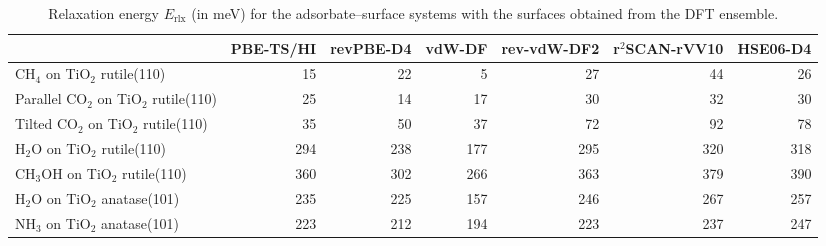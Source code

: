\begin{table}
\caption{\label{tab:lattice_parameters_tio2}Relaxation energy $E_\textrm{rlx}$ (in meV) for the adsorbate--surface systems with the  surfaces obtained from the DFT ensemble.}
\begin{tabular}{lrrrrrr}
\toprule
 & PBE-TS/HI & revPBE-D4 & vdW-DF & rev-vdW-DF2 & r$^2$SCAN-rVV10 & HSE06-D4 \\ 
\midrule
CH$_4$ on TiO$_2$ rutile(110) & 15 & 22 & 5 & 27 & 44 & 26 \\
Parallel CO$_2$ on TiO$_2$ rutile(110) & 25 & 14 & 17 & 30 & 32 & 30 \\
Tilted CO$_2$ on TiO$_2$ rutile(110) & 35 & 50 & 37 & 72 & 92 & 78 \\
H$_2$O on TiO$_2$ rutile(110) & 294 & 238 & 177 & 295 & 320 & 318 \\
CH$_3$OH on TiO$_2$ rutile(110) & 360 & 302 & 266 & 363 & 379 & 390 \\
H$_2$O on TiO$_2$ anatase(101) & 235 & 225 & 157 & 246 & 267 & 257 \\
NH$_3$ on TiO$_2$ anatase(101) & 223 & 212 & 194 & 223 & 237 & 247 \\
\bottomrule
\end{tabular}
\end{table}